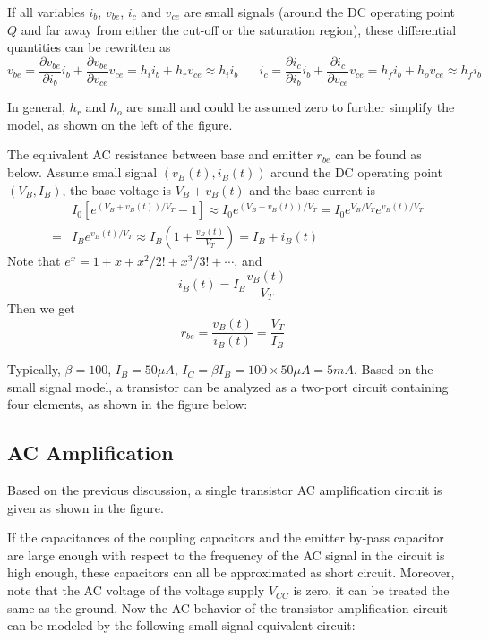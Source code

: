 If all variables $i_b$, $v_{be}$, $i_c$ and $v_{ce}$ are small signals (around 
the DC operating point $Q$ and far away from either the cut-off or the saturation 
region), these differential quantities can be rewritten as 
\[
	v_{be}=\frac{\partial v_{be}}{\partial i_b}
	i_b+\frac{\partial v_{be}}{\partial v_{ce}} v_{ce}=h_i i_b+h_r v_{ce}	
	\approx h_i i_b
	\;\;\;\;\;\;
	i_c=\frac{\partial i_c}{\partial i_b} i_b
	+\frac{\partial i_c}{\partial v_{ce}} v_{ce}=h_f i_b+h_o v_{ce}
	\approx h_f i_b
\]




In general, $h_r$ and $h_o$ are small and could be assumed zero to further 
simplify the model, as shown on the left of the figure.

The equivalent AC resistance between base and emitter $r_{be}$ can be found 
as below. Assume small signal $(v_B(t), i_B(t))$ around the DC operating point 
$(V_B, I_B)$, the base voltage is $V_B+v_B(t)$ and the base current is
\begin{eqnarray}
&& I_0 [e^{(V_B+v_B(t))/V_T}-1]\approx I_0 e^{(V_B+v_B(t))/V_T}
	=I_0 e^{V_B/V_T} e^{v_B(t)/V_T}
	\nonumber \\
&=& I_B e^{v_B(t)/V_T} \approx I_B(1+\frac{v_B(t)}{V_T})=I_B+i_B(t)	
\end{eqnarray}
Note that $e^x=1+x+x^2/2!+x^3/3!+\cdots $, and 
\[	i_B(t)=I_B \frac{v_B(t)}{V_T}	\]
Then we get
\[	r_{be}=\frac{v_B(t)}{i_B(t)}=\frac{V_T}{I_B}	\]

Typically, $\beta=100$, $I_B=50\mu A$, $I_C=\beta I_B=100\times 50\mu A=5mA$.
Based on the small signal model, a transistor can be analyzed as a two-port 
circuit containing four elements, as shown in the figure below:


\subsection*{AC Amplification}

Based on the previous discussion, a single transistor AC amplification circuit 
is given as shown in the figure.


If the capacitances of the coupling capacitors and the emitter by-pass 
capacitor are large enough with respect to the frequency of the AC signal 
in the circuit is high enough, these capacitors can all be approximated as 
short circuit. Moreover, note that the AC voltage of the voltage supply
$V_{CC}$ is zero, it can be treated the same as the ground. Now the AC
behavior of the transistor amplification circuit can be modeled by the 
following small signal equivalent circuit:

